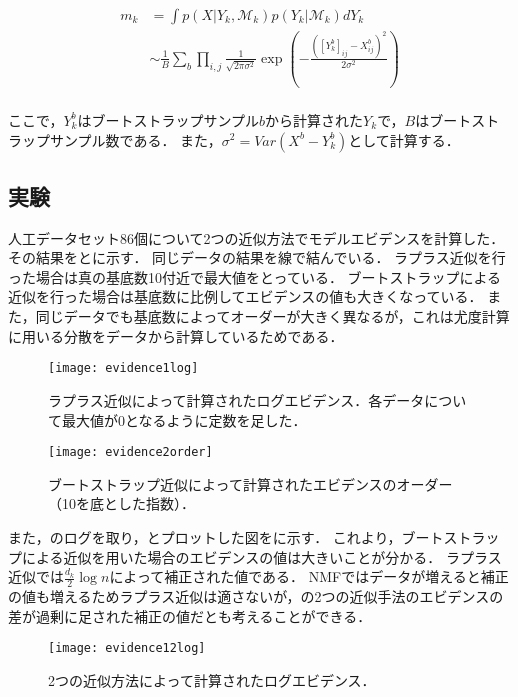 \begin{align}
	m_k &= \int p(X | Y_k, \mathcal{M}_k) p(Y_k| \mathcal{M}_k) dY_k \\
	&\sim \frac{1}{B} \sum_b \prod_{i,j} \frac{1}{\sqrt{2 \pi \sigma^2}} \exp\left(-\frac{([Y_k^b]_{ij} - X^b_{ij})^2}{2 \sigma^2} \right) \\
	\label{eq:simm2}
\end{align}

ここで，$Y_k^b$はブートストラップサンプル$b$から計算された$Y_k$で，$B$はブートストラップサンプル数である．
また，$\sigma^2 = Var(X^b - Y^b_k)$として計算する．

\subsection{実験}
人工データセット86個について2つの近似方法でモデルエビデンスを計算した．
その結果をとに示す．
同じデータの結果を線で結んでいる．
ラプラス近似を行った場合は真の基底数10付近で最大値をとっている．
ブートストラップによる近似を行った場合は基底数に比例してエビデンスの値も大きくなっている．
また，同じデータでも基底数によってオーダーが大きく異なるが，これは尤度計算に用いる分散をデータから計算しているためである．

\begin{figure}[htbp]
    \begin{minipage}{0.5\hsize}
			\begin{center}
					\texttt{[image: evidence1log]}
					\caption{ラプラス近似によって計算されたログエビデンス．各データについて最大値が0となるように定数を足した．}
					\label{fig:evidence1}
			\end{center}
		\end{minipage}
    \begin{minipage}{0.5\hsize}
			\begin{center}
					\texttt{[image: evidence2order]}
					\caption{ブートストラップ近似によって計算されたエビデンスのオーダー（10を底とした指数）．}
					\label{fig:evidence2}
			\end{center}
		\end{minipage}
\end{figure}

また，のログを取り，とプロットした図をに示す．
これより，ブートストラップによる近似を用いた場合のエビデンスの値は大きいことが分かる．
ラプラス近似では$\frac{d_k}{2} \log n$によって補正された値である．
NMFではデータが増えると補正の値も増えるためラプラス近似は適さないが，の2つの近似手法のエビデンスの差が過剰に足された補正の値だとも考えることができる．

\begin{figure}[htbp]
    \begin{center}
        \texttt{[image: evidence12log]}
        \caption{2つの近似方法によって計算されたログエビデンス．}
        \label{fig:evidence12}
    \end{center}
\end{figure}
